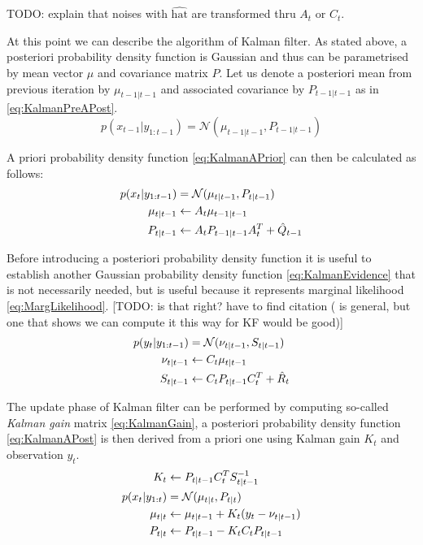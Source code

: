 \documentclass[a4paper,12pt,oneside]{report}
\newcommand{\pdf}{probability density function}
\begin{document}
TODO: explain that noises with \(\hat{\text{hat}}\) are transformed thru \(A_t\) or \(C_t\). %

At this point we can describe the algorithm of Kalman filter. As stated above, a posteriori {\pdf}
is Gaussian and thus can be parametrised by mean vector \(\mu\) and covariance matrix \(P\). Let us
denote a posteriori mean from previous iteration by \(\mu_{t-1|t-1}\) and associated covariance by
\(P_{t-1|t-1}\) as in \eqref{eq:KalmanPreAPost}.
\begin{equation} \label{eq:KalmanPreAPost}
	p(x_{t-1} | y_{1:t-1}) = \mathcal{N}(\mu_{t-1|t-1}, P_{t-1|t-1})
\end{equation}

A priori {\pdf} \eqref{eq:KalmanAPrior} can then be calculated as follows:~\cite{AruMasGor:02}
\begin{align}
	p(x_t | y_{1:t-1}) &= \mathcal{N}(\mu_{t|t-1}, P_{t|t-1}) \label{eq:KalmanAPrior} \\
	\mu_{t|t-1} &\leftarrow A_t \mu_{t-1|t-1} \notag \\
	P_{t|t-1} &\leftarrow A_t P_{t-1|t-1} A_t^T + \hat{Q}_{t-1} \notag
\end{align}

Before introducing a posteriori {\pdf} it is useful to establish another Gaussian {\pdf}
\eqref{eq:KalmanEvidence} that is not necessarily needed, but is useful because it represents
marginal likelihood \eqref{eq:MargLikelihood}. %
[TODO: is that right? have to find citation (\cite{Smi:10} is general, but one that shows we can compute it this way for KF would be good)]
\begin{align}
	p(y_t|y_{1:t-1}) &= \mathcal{N}(\nu_{t|t-1}, S_{t|t-1}) \label{eq:KalmanEvidence} \\
	\nu_{t|t-1} &\leftarrow C_t \mu_{t|t-1} \notag \\
	S_{t|t-1} &\leftarrow C_t P_{t|t-1} C_t^T + \hat{R}_t \notag
\end{align}

The update phase of Kalman filter can be performed by computing so-called \emph{Kalman gain} matrix
\eqref{eq:KalmanGain}, a posteriori {\pdf} \eqref{eq:KalmanAPost} is then derived from a priori one
using Kalman gain \(K_t\) and observation \(y_t\).~\cite{AruMasGor:02}
\begin{align}
	K_t &\leftarrow P_{t|t-1} C_t^T S_{t|t-1}^{-1} \label{eq:KalmanGain} \\[\parskip]
	p(x_t|y_{1:t}) &= \mathcal{N}(\mu_{t|t}, P_{t|t}) \label{eq:KalmanAPost} \\
	\mu_{t|t} &\leftarrow \mu_{t|t-1} + K_t(y_t - \nu_{t|t-1}) \notag \\
	P_{t|t} &\leftarrow P_{t|t-1} - K_t C_t P_{t|t-1} \notag
\end{align}
\end{document}
